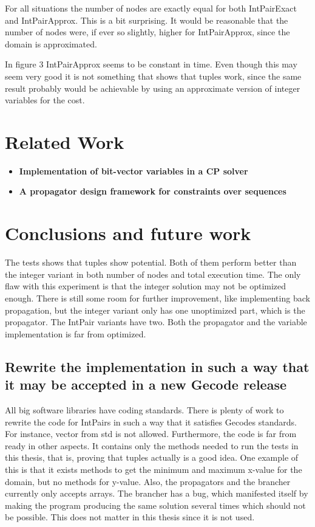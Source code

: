 \documentclass[a4paper,11pt]{article}
\begin{document}
For all situations the number of nodes are exactly equal for both IntPairExact and IntPairApprox. This is a bit surprising. It would be reasonable that the number of nodes were, if ever so slightly, higher for IntPairApprox, since the domain is approximated.

In figure 3 IntPairApprox seems to be constant in time. Even though this may seem very good it is not something that shows that tuples work, since the same result probably would be achievable by using an approximate version of integer variables for the cost.

\section{Related Work}
\begin{itemize}
\item{\textbf{Implementation of bit-vector variables in a CP solver}}
\item{\textbf{A propagator design framework for constraints over sequences}}
\end{itemize}

\section{Conclusions and future work}
The tests shows that tuples show potential. Both of them perform better than the integer variant in both number of nodes and total execution time. The only flaw with this experiment is that the integer solution may not be optimized enough. There is still some room for further improvement, like implementing back propagation, but the integer variant only has one unoptimized part, which is the propagator. The IntPair variants have two. Both the propagator and the variable implementation is far from optimized. 

\subsection{Rewrite the implementation in such a way that it may be accepted in a new Gecode release}
All big software libraries have coding standards. There is plenty of work to rewrite the code for IntPairs in such a way that it satisfies Gecodes standards. For instance, vector from std is not allowed. Furthermore, the code is far from ready in other aspects. It contains only the methods needed to run the tests in this thesis, that is, proving that tuples actually is a good idea. One example of this is that it exists methods to get the minimum and maximum x-value for the domain, but no methods for y-value. Also, the propagators and the brancher currently only accepts arrays. The brancher has a bug, which manifested itself by making the program producing the same solution several times which should not be possible. This does not matter in this thesis since it is not used.
\end{document}
